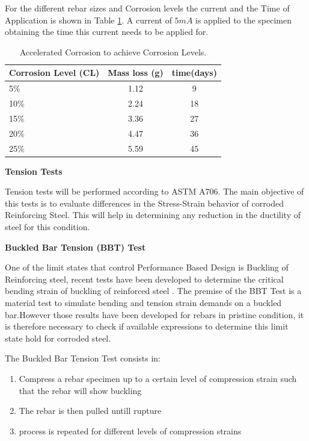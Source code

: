 For the different rebar sizes and Corrosion levels the current and the Time of Application is shown in Table \ref{tab:AcceleratedCorrosionTime}. A current of $5 mA$ is applied to the specimen obtaining the time this current needs to be applied for.

\begin{table}[htbp]
	\caption{Accelerated Corrosion to achieve Corrosion Levels.}
	\label{tab:AcceleratedCorrosionTime}
	\centering	
		\begin{tabular}{|l|c|c|}
		\hline
		Corrosion Level (CL) & Mass loss (g)   & time(days)     \\  \hline	
		5\%                  & 1.12            & 9  \\  \hline	
		10\%                 & 2.24            & 18 \\  \hline	
		15\%                 & 3.36            & 27 \\  \hline	
		20\%                 & 4.47            & 36 \\  \hline	
		25\%                 & 5.59            & 45 \\  \hline	
		\end{tabular}
\end{table}


\textbf{Tension Tests}

Tension tests will be performed according to ASTM A706. The main objective of this tests is to evaluate differences in the Stress-Strain behavior of corroded Reinforcing Steel. This will help in determining any reduction in the ductility of steel for this condition.

\textbf{Buckled Bar Tension (BBT) Test}

One of the limit states that control Performance Based Design is Buckling of Reinforcing steel, recent tests have been developed to determine the critical bending strain of buckling of reinforced steel \cite{Barcley2019}. The premise of the BBT Test is a material test to simulate bending and tension strain demands on a buckled bar.However those results have been developed for rebars in pristine condition, it is therefore necessary to check if available expressions to determine this limit state hold for corroded steel.

The Buckled Bar Tension Test consists in:

\begin{enumerate}
	\item Compress a rebar specimen up to a certain level of compression strain such that the rebar will show buckling
	\item The rebar is then pulled untill rupture
	\item process is repeated for different levels of compression strains 
\end{enumerate}


